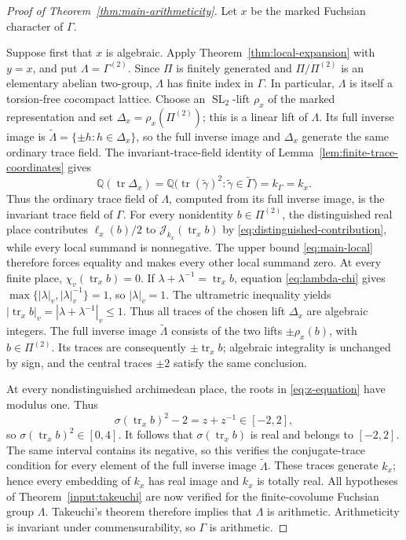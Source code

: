 \documentclass[11pt,reqno]{amsart}
\theoremstyle{definition}
\theoremstyle{remark}
\newcommand{\Q}{\mathbb Q}
\newcommand{\cJ}{\mathcal J}
\newcommand{\Tr}{\operatorname{tr}}
\newcommand{\SL}{\operatorname{SL}}
\begin{document}
\begin{proof}[Proof of Theorem~\ref{thm:main-arithmeticity}]
Let \(x\) be the marked Fuchsian character of \(\Gamma\).

Suppose first that \(x\) is algebraic.  Apply
Theorem~\ref{thm:local-expansion} with \(y=x\), and put
\(\Lambda=\Gamma^{(2)}\).  Since \(\Pi\) is finitely generated and
\(\Pi/\Pi^{(2)}\) is an elementary abelian two-group, \(\Lambda\) has
finite index in \(\Gamma\).  In particular, \(\Lambda\) is itself a
torsion-free cocompact lattice.  Choose an \(\SL_2\)-lift \(\rho_x\) of the
marked representation and set
\(\Delta_x=\rho_x(\Pi^{(2)})\); this is a linear lift of \(\Lambda\).
Its full inverse image is
\(\widetilde\Lambda=\{\pm h:h\in\Delta_x\}\), so the full inverse image and
\(\Delta_x\) generate the same ordinary trace field.
The invariant-trace-field identity of
Lemma~\ref{lem:finite-trace-coordinates} gives
\[
 \Q(\Tr\Delta_x)
 =\Q\bigl(\Tr(\widetilde\gamma)^2:
             \widetilde\gamma\in\widetilde\Gamma\bigr)
 =k_\Gamma=k_x.
\]
Thus the ordinary trace field of \(\Lambda\), computed from its full
inverse image, is the invariant trace field of \(\Gamma\).
For every nonidentity
\(b\in\Pi^{(2)}\), the distinguished real place contributes
\(\ell_x(b)/2\) to \(\cJ_{k_x}(\Tr_xb)\) by
\eqref{eq:distinguished-contribution}, while every local summand is
nonnegative.  The upper bound \eqref{eq:main-local} therefore forces
equality and makes every other local summand zero.  At every finite place,
\(\chi_v(\Tr_xb)=0\).  If
\(\lambda+\lambda^{-1}=\Tr_xb\), equation
\eqref{eq:lambda-chi} gives
\(\max\{|\lambda|_v,|\lambda|_v^{-1}\}=1\), so
\(|\lambda|_v=1\).  The ultrametric inequality yields
\(|\Tr_xb|_v=|\lambda+\lambda^{-1}|_v\le1\).
Thus all traces of the chosen lift \(\Delta_x\) are algebraic integers.
The full inverse image \(\widetilde\Lambda\) consists of the two lifts
\(\pm\rho_x(b)\), with \(b\in\Pi^{(2)}\).  Its traces are consequently
\(\pm\Tr_x b\); algebraic integrality is unchanged by sign, and the central
traces \(\pm2\) satisfy the same conclusion.

At every nondistinguished archimedean place, the roots in
\eqref{eq:z-equation} have modulus one.  Thus
\[
 \sigma(\Tr_xb)^2-2=z+z^{-1}\in[-2,2],
\]
so \(\sigma(\Tr_xb)^2\in[0,4]\).  It follows that
\(\sigma(\Tr_xb)\) is real and belongs to \([-2,2]\).  The same interval
contains its negative, so this verifies the conjugate-trace condition for
every element of the full inverse image \(\widetilde\Lambda\).  These traces
generate \(k_x\); hence every embedding of \(k_x\) has real image and
\(k_x\) is totally real.  All hypotheses of
Theorem~\ref{input:takeuchi} are now verified for the finite-covolume
Fuchsian group \(\Lambda\).  Takeuchi's theorem therefore implies that
\(\Lambda\) is arithmetic.  Arithmeticity is invariant under
commensurability, so \(\Gamma\) is arithmetic.


\end{proof}
\end{document}
